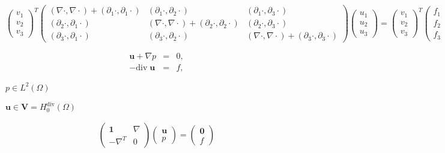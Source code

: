 \documentclass{article}
\begin{document}
\[ \begin{pmatrix} v_1 \\ v_2 \\ v_3 \end{pmatrix}^T \begin{pmatrix} (\nabla \cdot,\nabla \cdot) + (\partial_1 \cdot,\partial_1 \cdot) & (\partial_1 \cdot,\partial_2 \cdot) & (\partial_1 \cdot,\partial_3 \cdot) \\ (\partial_2 \cdot,\partial_1 \cdot) & (\nabla \cdot,\nabla \cdot) + (\partial_2 \cdot,\partial_2 \cdot) & (\partial_2 \cdot,\partial_3 \cdot) \\ (\partial_3 \cdot,\partial_1 \cdot) & (\partial_3 \cdot,\partial_2 \cdot) & (\nabla \cdot,\nabla \cdot) + (\partial_3 \cdot,\partial_3 \cdot) \end{pmatrix} \begin{pmatrix} u_1 \\ u_2 \\ u_3 \end{pmatrix} = \begin{pmatrix} v_1 \\ v_2 \\ v_3 \end{pmatrix}^T \begin{pmatrix} f_1 \\ f_2 \\ f_3\end{pmatrix} \]
\pagebreak

\begin{eqnarray*} \textbf{u} + \nabla p &=& 0, \\ -\textrm{div}\; \textbf{u} &=& f, \end{eqnarray*}
\pagebreak

$p \in L^2(\Omega)$
\pagebreak

$\mathbf u \in \mathbf V = H^{\text{div}}_0(\Omega)$
\pagebreak

\begin{eqnarray*} \left( \begin{array}{cc} \mathbf 1 & \nabla \\ -\nabla^T & 0 \end{array} \right) \left( \begin{array}{c} \mathbf u \\ p \end{array} \right) = \left( \begin{array}{c} \mathbf 0 \\ f \end{array} \right) \end{eqnarray*}
\pagebreak
\end{document}
